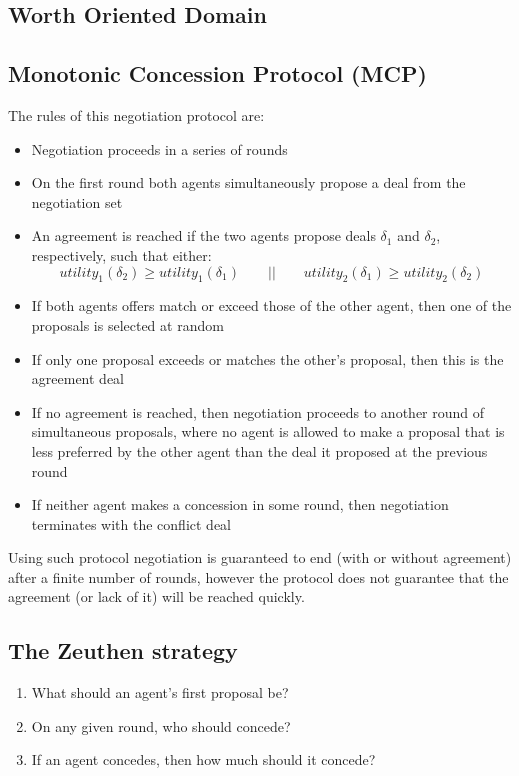 \subsection{Worth Oriented Domain}
\subsection{Monotonic Concession Protocol (MCP)}
The rules of this negotiation protocol are:
\begin{itemize}
\item Negotiation proceeds in a series of rounds
\item On the first round both agents simultaneously propose a deal from the negotiation set
\item An agreement is reached if the two agents propose deals $\delta_1$ and $\delta_2$, respectively, such that either:
\[utility_1(\delta_2) \ge utility_1(\delta_1)\qquad || \qquad utility_2(\delta_1)\ge utility_2(\delta_2)\]
\item If both agents offers match or exceed those of the other agent, then one of the proposals is selected at random
\item If only one proposal exceeds or matches the other's proposal, then this is the agreement deal
\item If no agreement is reached, then negotiation proceeds to another round of simultaneous proposals, where no agent is allowed to make a proposal that is less preferred by the other agent than the deal it proposed at the previous round
\item If neither agent makes a concession in some round, then negotiation terminates with the conflict deal
\end{itemize}

Using such protocol negotiation is guaranteed to end (with or without agreement) after a finite number of rounds, however the protocol does not guarantee that the agreement (or lack of it) will be reached quickly.
\subsection{The Zeuthen strategy}
\begin{enumerate}
\item What should an agent's first proposal be?
\item On any given round, who should concede?
\item If an agent concedes, then how much should it concede?
\end{enumerate}

